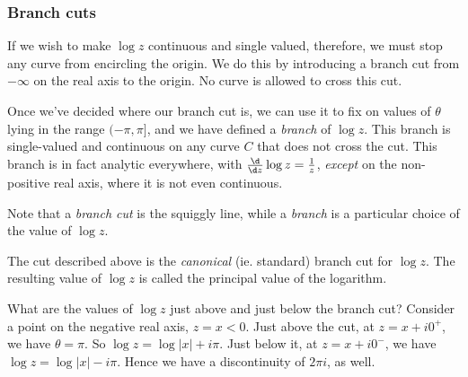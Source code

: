 \documentclass[a4paper]{article}
\begin{document}
\subsubsection*{Branch cuts}
If we wish to make $\log z$ continuous and single valued, therefore, we must stop any curve from encircling the origin. We do this by introducing a branch cut from $-\infty$ on the real axis to the origin. No curve is allowed to cross this cut.
\begin{center}
\end{center}
Once we've decided where our branch cut is, we can use it to fix on values of $\theta$ lying in the range $(-\pi, \pi]$, and we have defined a \emph{branch} of $\log z$. This branch is single-valued and continuous on any curve $C$ that does not cross the cut. This branch is in fact analytic everywhere, with $\frac{\d}{\d z} \log z = \frac{1}{z}$, \emph{except} on the non-positive real axis, where it is not even continuous.

Note that a \emph{branch cut} is the squiggly line, while a \emph{branch} is a particular choice of the value of $\log z$.

The cut described above is the \emph{canonical} (ie. standard) branch cut for $\log z$. The resulting value of $\log z$ is called the principal value of the logarithm.

What are the values of $\log z$ just above and just below the branch cut? Consider a point on the negative real axis, $z = x < 0$. Just above the cut, at $z = x + i 0^+$, we have $\theta = \pi$. So $\log z = \log |x| + i \pi$. Just below it, at $z = x + i0^-$, we have $\log z = \log |x| - i \pi$. Hence we have a discontinuity of $2\pi i$, as well.
\end{document}
